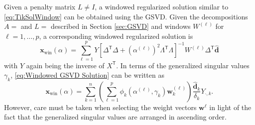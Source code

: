 \documentclass[12pt]{article}
\newcommand{\dVec}{\mathbf{d}}	%
\newcommand{\xVec}{\mathbf{x}}	%
\newcommand{\wVec}{\mathbf{w}}	%
\newcommand{\trans}[1]{{#1}^\mathsf{T}}	%
\newcommand{\inv}[1]{{#1}^{-1}}	%
\newcommand{\dft}[1]{\widehat{#1}}	%
\newcommand{\regparam}{\alpha}  %
\newcommand{\xWin}{\xVec_{\text{win}}(\regparam)}	%
\newcommand{\filt}{\phi}
\begin{document}
Given a penalty matrix $L \neq I$, a windowed regularized solution similar to \eqref{eq:TikSolWindow} can be obtained using the GSVD. Given the decompositions $A = $ and $L = $ described in Section \ref{sec:GSVD} and windows $W^{(\ell)}$ for $\ell = 1,\ldots,p$, a corresponding windowed regularized solution is
\begin{equation}
\label{eq:Windowed GSVD Solution}
    \xWin = \sum_{\ell=1}^p Y\inv{\left[\trans{\Delta}\Delta + \left(\regparam^{(\ell)}\right)^2 \trans{\Lambda}\Lambda\right]}W^{(\ell)}\trans{\Delta}\dft{\dVec}
\end{equation}
with $Y$ again being the inverse of $\trans{X}$. In terms of the generalized singular values $\gamma_k$, \eqref{eq:Windowed GSVD Solution} can be written as
\begin{equation}
\label{eq:Windowed GSVD Solution Sum}
    \xWin = \sum_{k=1}^n \left(\sum_{\ell=1}^p \filt_k\left(\regparam^{(\ell)},\gamma_k\right)\wVec^{(\ell)}_{k}\right)  \frac{\dft{\dVec}_{k}}{\delta_k} Y_{\cdot,k}.
\end{equation}
However, care must be taken when selecting the weight vectors $\wVec^{\ell}$ in light of the fact that the generalized singular values are arranged in ascending order.
\end{document}
